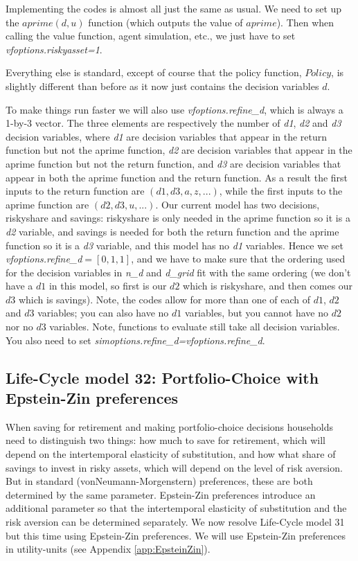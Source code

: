 Implementing the codes is almost all just the same as usual. We need to set up the $aprime(d,u)$ function (which outputs the value of $aprime$). Then when calling the value function, agent simulation, etc., we just have to set \textit{vfoptions.riskyasset=1}.

Everything else is standard, except of course that the policy function, $Policy$, is slightly different than before as it now just contains the decision variables $d$.

To make things run faster we will also use \textit{vfoptions.refine\_{}d}, which is always a 1-by-3 vector. The three elements are respectively the number of \textit{d1}, \textit{d2} and \textit{d3} decision variables, where \textit{d1} are decision variables that appear in the return function but not the aprime function, \textit{d2} are decision variables that appear in the aprime function but not the return function, and \textit{d3} are decision variables that appear in both the aprime function and the return function. As a result the first inputs to the return function  are $(d1,d3,a,z,...)$, while the first inputs to the aprime function are $(d2,d3,u,...)$. Our current model has two decisions, riskyshare and savings: riskyshare is only needed in the aprime function so it is a \textit{d2} variable, and savings is needed for both the return function and the aprime function so it is a \textit{d3} variable, and this model has no \textit{d1} variables. Hence we set \textit{vfoptions.refine\_{}d}$=[0,1,1]$, and we have to make sure that the ordering used for the decision variables in \textit{n\_{}d} and \textit{d\_{}grid} fit with the same ordering (we don't have a $d1$ in this model, so first is our $d2$ which is riskyshare, and then comes our $d3$ which is savings). Note, the codes allow for more than one of each of $d1$, $d2$ and $d3$ variables; you can also have no $d1$ variables, but you cannot have no $d2$ nor no $d3$ variables. Note, functions to evaluate still take all decision variables. You also need to set \textit{simoptions.refine\_{}d=vfoptions.refine\_{}d}.


\subsection{Life-Cycle model 32: Portfolio-Choice with Epstein-Zin preferences}
When saving for retirement and making portfolio-choice decisions households need to distinguish two things: how much to save for retirement, which will depend on the intertemporal elasticity of substitution, and how what share of savings to invest in risky assets, which will depend on the level of risk aversion. But in standard (vonNeumann-Morgenstern) preferences, these are both determined by the same parameter. Epstein-Zin preferences introduce an additional parameter so that the intertemporal elasticity of substitution and the risk aversion can be determined separately. We now resolve Life-Cycle model 31 but this time using Epstein-Zin preferences. We will use Epstein-Zin preferences in utility-units (see Appendix \ref{app:EpsteinZin}).

